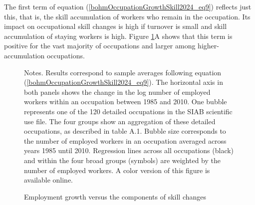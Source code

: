 \documentclass[12pt]{article}
\theoremstyle{definition}
\begin{document}
The first term of equation (\ref{bohmOccupationGrowthSkill2024_eq9}) reflects just this, that is, the skill accumulation of workers who remain in the occupation. Its impact on occupational skill changes is high if turnover is small and skill accumulation of staying workers is high. Figure \ref{bohmOccupationGrowthSkill2024_fig7}A shows that this term is positive for the vast majority of occupations and larger among higher-accumulation occupations.

\begin{figure}[H]
    \noindent\caption{Employment growth versus the components of skill changes}
    \begin{center}
        \label{bohmOccupationGrowthSkill2024_fig7}
    \end{center}
    \vspace{-20pt}
    {\footnotesize Notes. Results correspond to sample averages following equation (\ref{bohmOccupationGrowthSkill2024_eq9}). The horizontal axis in both panels shows the change in the log number of employed workers within an occupation between 1985 and 2010. One bubble represents one of the 120 detailed occupations in the SIAB scientific use file. The four groups show an aggregation of these detailed occupations, as described in table A.1. Bubble size corresponds to the number of employed workers in an occupation averaged across years 1985 until 2010. Regression lines across all occupations (black) and within the four broad groups (symbols) are weighted by the number of employed workers. A color version of this figure is available online.}
\end{figure}
\end{document}
